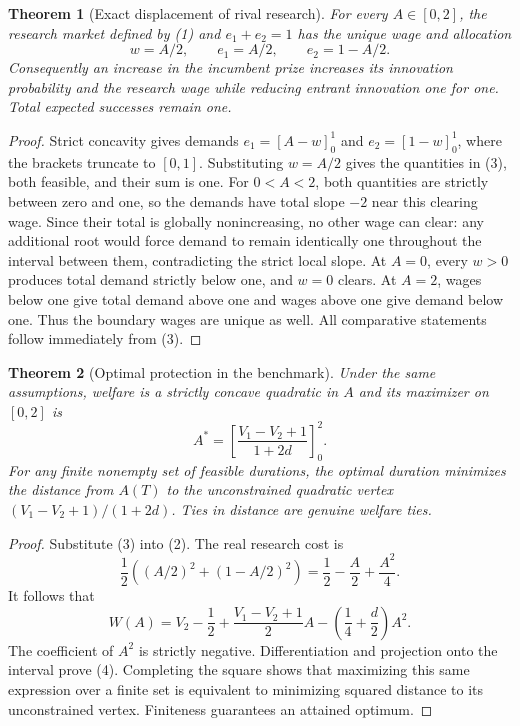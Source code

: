 \documentclass[11pt]{article}
\newtheorem{theorem}{Theorem}
\theoremstyle{definition}
\begin{document}
\begin{theorem}[Exact displacement of rival research]
For every $A\in[0,2]$, the research market defined by (1) and $e_1+e_2=1$ has the unique wage and allocation
\[
 w=A/2,\qquad e_1=A/2,\qquad e_2=1-A/2.
 \tag{3}
\]
Consequently an increase in the incumbent prize increases its innovation probability and the research wage while reducing entrant innovation one for one. Total expected successes remain one.
\end{theorem}
\begin{proof}
Strict concavity gives demands $e_1=[A-w]_0^1$ and $e_2=[1-w]_0^1$, where the brackets truncate to $[0,1]$. Substituting $w=A/2$ gives the quantities in (3), both feasible, and their sum is one. For $0<A<2$, both quantities are strictly between zero and one, so the demands have total slope $-2$ near this clearing wage. Since their total is globally nonincreasing, no other wage can clear: any additional root would force demand to remain identically one throughout the interval between them, contradicting the strict local slope. At $A=0$, every $w>0$ produces total demand strictly below one, and $w=0$ clears. At $A=2$, wages below one give total demand above one and wages above one give demand below one. Thus the boundary wages are unique as well. All comparative statements follow immediately from (3).
\end{proof}

\begin{theorem}[Optimal protection in the benchmark]
Under the same assumptions, welfare is a strictly concave quadratic in $A$ and its maximizer on $[0,2]$ is
\[
 A^*=\left[\frac{V_1-V_2+1}{1+2d}\right]_0^2.
 \tag{4}
\]
For any finite nonempty set of feasible durations, the optimal duration minimizes the distance from $A(T)$ to the unconstrained quadratic vertex $(V_1-V_2+1)/(1+2d)$. Ties in distance are genuine welfare ties.
\end{theorem}
\begin{proof}
Substitute (3) into (2). The real research cost is
\[
 \frac12\left((A/2)^2+(1-A/2)^2\right)
 =\frac12-\frac A2+\frac{A^2}{4}.
\]
It follows that
\[
 W(A)=V_2-\frac12+
 \frac{V_1-V_2+1}{2}A-
 \left(\frac14+\frac d2\right)A^2.
\]
The coefficient of $A^2$ is strictly negative. Differentiation and projection onto the interval prove (4). Completing the square shows that maximizing this same expression over a finite set is equivalent to minimizing squared distance to its unconstrained vertex. Finiteness guarantees an attained optimum.
\end{proof}
\end{document}
